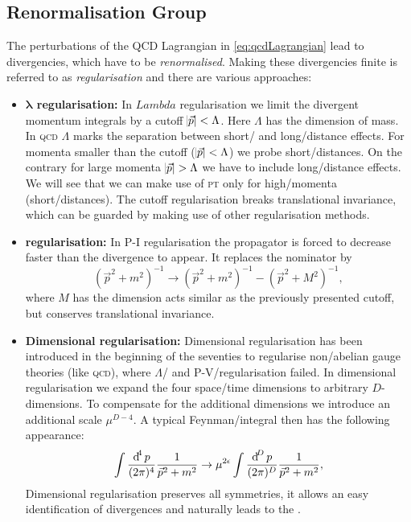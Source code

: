 \documentclass[../../index.tex]{subfiles}
\begin{document}
\subsection{Renormalisation Group}
The perturbations of the QCD Lagrangian in \cref{eq:qcdLagrangian} lead to
divergencies, which have to be \textit{renormalised}. Making these divergencies
finite is referred to as \textit{regularisation} and there are various
approaches:
\begin{itemize}
\item \label{itm:lambdaRegularisation}\textbf{$\bm{\lambda}$ regularisation:} In
  $Lambda$ regularisation we limit the divergent momentum integrals by a cutoff
  $\abs{\vec p} < \Lambda$. Here $\Lambda$ has the dimension of mass. In
  \textsc{qcd} $\Lambda$ marks the separation between short\-/ and
  long\-/distance effects. For momenta smaller than the cutoff ($\abs{\vec p} <
  \Lambda$) we probe short\-/distances. On the contrary for large momenta
  $\abs{\vec p} > \Lambda$ we have to include long\-/distance effects. We will
  see that we can make use of \textsc{pt} only for high\-/momenta
  (short\-/distances). The cutoff regularisation breaks translational
  invariance, which can be guarded by making use of other regularisation
  methods.
\item \textbf{ regularisation:} \cite{Pauli1949} In
  \textsc{P-I} regularisation the propagator is forced to decrease faster than
  the divergence to appear. It replaces the nominator by
  \begin{equation}
    (\vec p^2 + m^2)^{-1} \to (\vec p^2 + m^2)^{-1} - (\vec p^2 + M^2)^{-1},
  \end{equation}
  where $M$ has the dimension acts similar as the previously presented cutoff,
  but conserves translational invariance.
\item \textbf{Dimensional regularisation:}
  \cite{Bollini1972,tHooft1972,tHooft1973} Dimensional regularisation has been
  introduced in the beginning of the seventies to regularise non\-/abelian gauge
  theories (like \textsc{qcd}), where $\Lambda$\-/ and
  \textsc{P-V}\-/regularisation failed. In dimensional regularisation we expand
  the four space\-/time dimensions to arbitrary $D$-dimensions. To compensate
  for the additional dimensions we introduce an additional scale $\mu^{D-4}$. A
  typical Feynman\-/integral then has the following appearance:
  \begin{equation}
    \label{eq:dimRegFeynmanIntegral}
    \int \fdif{p} \frac{1}{\vec p^2 + m^2} \to \mu^{2\epsilon} \int \frac{\dif^D p}{(2\pi)^D}\frac{1}{\vec p^2+m^2},
  \end{equation}
  Dimensional regularisation preserves all symmetries, it allows an easy
  identification of divergences and naturally leads to the  \cite{tHooft1973,Weinberg1973a}.
\end{itemize}
\end{document}
